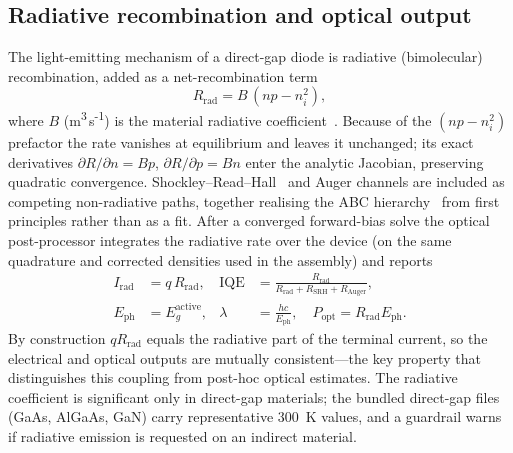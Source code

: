 \documentclass[conference]{IEEEtran}
\begin{document}
\subsection{Radiative recombination and optical output}
\label{sec:rad}
The light-emitting mechanism of a direct-gap diode is radiative (bimolecular)
recombination, added as a net-recombination term
\begin{equation}
R_{\mathrm{rad}}=B\,(np-n_i^2),
\end{equation}
where $B$ (m\textsuperscript{3}\,s\textsuperscript{-1}) is the material radiative
coefficient~\cite{olshansky}. Because of the $(np-n_i^2)$ prefactor the rate
vanishes at equilibrium and leaves it unchanged; its exact derivatives
$\partial R/\partial n=Bp$, $\partial R/\partial p=Bn$ enter the analytic Jacobian,
preserving quadratic convergence. Shockley--Read--Hall~\cite{shockley,hall} and
Auger channels are included as competing non-radiative paths, together realising
the ABC hierarchy~\cite{karpov} from first principles rather than as a fit. After a
converged forward-bias solve the optical post-processor integrates the radiative
rate over the device (on the same quadrature and corrected densities used in the
assembly) and reports
\begin{align}
I_{\mathrm{rad}} &= q\,R_{\mathrm{rad}}, &
\mathrm{IQE} &= \frac{R_{\mathrm{rad}}}{R_{\mathrm{rad}}+R_{\mathrm{SRH}}+R_{\mathrm{Auger}}},\\
E_{\mathrm{ph}} &= E_g^{\mathrm{active}}, &
\lambda &= \frac{hc}{E_{\mathrm{ph}}}, \quad P_{\mathrm{opt}}=R_{\mathrm{rad}}E_{\mathrm{ph}}.
\end{align}
By construction $q R_{\mathrm{rad}}$ equals the radiative part of the terminal
current, so the electrical and optical outputs are mutually consistent---the key
property that distinguishes this coupling from post-hoc optical estimates. The
radiative coefficient is significant only in direct-gap materials; the bundled
direct-gap files (GaAs, AlGaAs, GaN) carry representative $300$~K values, and a
guardrail warns if radiative emission is requested on an indirect material.
\end{document}
